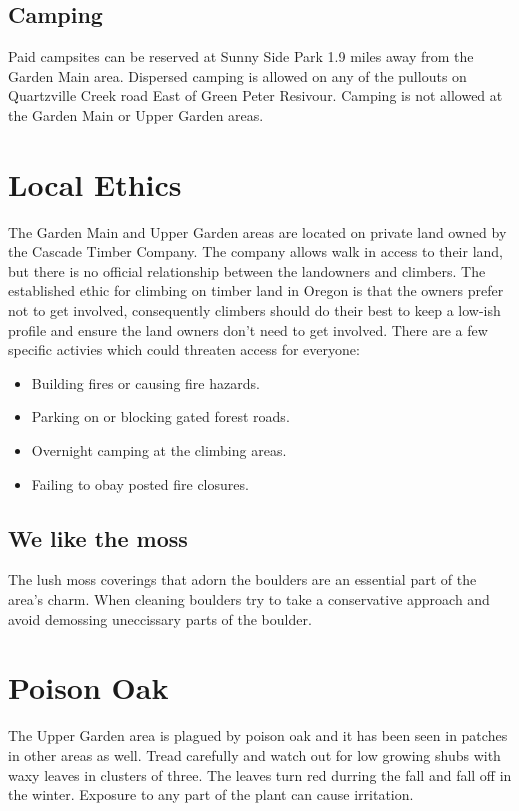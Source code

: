 \subsection*{Camping}
Paid campsites can be reserved at Sunny Side Park 1.9 miles away from the Garden Main area. Dispersed camping is allowed on any of the pullouts on Quartzville Creek road East of Green Peter Resivour. Camping is not allowed at the Garden Main or Upper Garden areas.
\section{Local Ethics}
The Garden Main and Upper Garden areas are located on private land owned by the Cascade Timber Company. The company allows walk in access to their land, but there is no official relationship between the landowners and climbers. The established ethic for climbing on timber land in Oregon is that the owners prefer not to get involved, consequently climbers should do their best to keep a low-ish profile and ensure the land owners don't need to get involved. There are a few specific activies which could threaten access for everyone:\\
\begin{itemize}
\item Building fires or causing fire hazards.\\
\item Parking on or blocking gated forest roads.\\
\item Overnight camping at the climbing areas.\\
\item Failing to obay posted fire closures.\\
\end{itemize}
\subsection*{We like the moss}
The lush moss coverings that adorn the boulders are an essential part of the area's charm. When cleaning boulders try to take a conservative approach and avoid demossing uneccissary parts of the boulder.
\section{Poison Oak}
The Upper Garden area is plagued by poison oak and it has been seen in patches in other areas as well. Tread carefully and watch out for low growing shubs with waxy leaves in clusters of three. The leaves turn red durring the fall and fall off in the winter. Exposure to any part of the plant can cause irritation.

